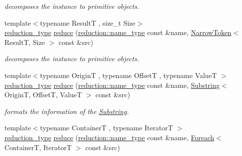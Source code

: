 \begin{DoxyCompactItemize}
\begin{DoxyCompactList}\small\item\em decomposes the instance to primitive objects. \end{DoxyCompactList}\item 
\hypertarget{namespacehryky_a5245acc3760966a01a0bf0eddbba7b11}{{\footnotesize template$<$typename Result\-T , size\-\_\-t Size$>$ }\\\hyperlink{namespacehryky_a343a9a4c36a586be5c2693156200eadc}{reduction\-\_\-type} \hyperlink{namespacehryky_a5245acc3760966a01a0bf0eddbba7b11}{reduce} (\hyperlink{namespacehryky_1_1reduction_ac686c30a4c8d196bbd0f05629a6b921f}{reduction\-::name\-\_\-type} const \&name, \hyperlink{classhryky_1_1_narrow_token}{Narrow\-Token}$<$ Result\-T, Size $>$ const \&src)}\label{namespacehryky_a5245acc3760966a01a0bf0eddbba7b11}

\begin{DoxyCompactList}\small\item\em decomposes the instance to primitive objects. \end{DoxyCompactList}\item 
\hypertarget{namespacehryky_ade7f6355e1c5f98b8a23c239f26a715d}{{\footnotesize template$<$typename Origin\-T , typename Offset\-T , typename Value\-T $>$ }\\\hyperlink{namespacehryky_a343a9a4c36a586be5c2693156200eadc}{reduction\-\_\-type} \hyperlink{namespacehryky_ade7f6355e1c5f98b8a23c239f26a715d}{reduce} (\hyperlink{namespacehryky_1_1reduction_ac686c30a4c8d196bbd0f05629a6b921f}{reduction\-::name\-\_\-type} const \&name, \hyperlink{classhryky_1_1_substring}{Substring}$<$ Origin\-T, Offset\-T, Value\-T $>$ const \&src)}\label{namespacehryky_ade7f6355e1c5f98b8a23c239f26a715d}

\begin{DoxyCompactList}\small\item\em formats the information of the \hyperlink{classhryky_1_1_substring}{Substring}. \end{DoxyCompactList}\item 
\hypertarget{namespacehryky_a1ed5921c3b79b513b658b10f5a963c50}{{\footnotesize template$<$typename Container\-T , typename Iterator\-T $>$ }\\\hyperlink{namespacehryky_a343a9a4c36a586be5c2693156200eadc}{reduction\-\_\-type} \hyperlink{namespacehryky_a1ed5921c3b79b513b658b10f5a963c50}{reduce} (\hyperlink{namespacehryky_1_1reduction_ac686c30a4c8d196bbd0f05629a6b921f}{reduction\-::name\-\_\-type} const \&name, \hyperlink{classhryky_1_1_foreach}{Foreach}$<$ Container\-T, Iterator\-T $>$ const \&src)}\label{namespacehryky_a1ed5921c3b79b513b658b10f5a963c50}


\end{DoxyCompactItemize}
